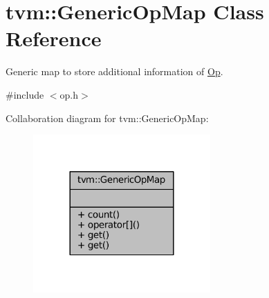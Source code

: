 \hypertarget{classtvm_1_1GenericOpMap}{}\section{tvm\+:\+:Generic\+Op\+Map Class Reference}
\label{classtvm_1_1GenericOpMap}


Generic map to store additional information of \hyperlink{classtvm_1_1Op}{Op}.  




{\ttfamily \#include $<$op.\+h$>$}



Collaboration diagram for tvm\+:\+:Generic\+Op\+Map\+:
\nopagebreak
\begin{figure}[H]
\begin{center}
\leavevmode
\includegraphics[width=192pt]{classtvm_1_1GenericOpMap__coll__graph}
\end{center}
\end{figure}
